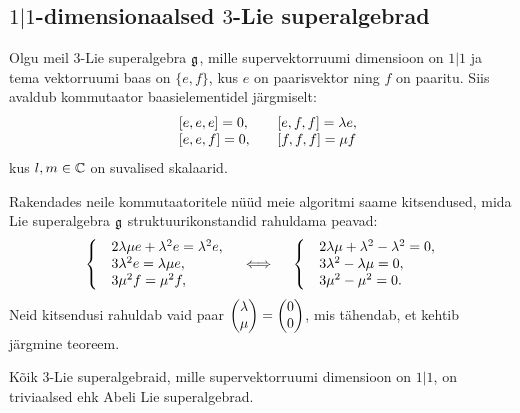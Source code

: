 
\subsection{\texorpdfstring{$1|1$}{1|1}-dimensionaalsed
    \texorpdfstring{$3$}{3}-Lie superalgebrad}

Olgu meil $3$-Lie superalgebra $\mathfrak{g}$, mille supervektorruumi dimensioon
on $1|1$ ja tema vektorruumi baas on $\{ e, f \}$, kus $e$ on paarisvektor
ning $f$ on paaritu. Siis avaldub kommutaator baasielementidel järgmiselt:
\begin{align*}
    \begin{matrix*}[l]
        &[e, e, e] = 0,\quad
        &[e, f, f] = \l e, \\
        &[e, e, f] = 0,\quad
        &[f, f, f] = \m f
    \end{matrix*}
\end{align*}
kus $l, m \in \mathbb{C}$ on suvalised skalaarid.

Rakendades neile kommutaatoritele nüüd meie algoritmi saame kitsendused,
mida Lie superalgebra $\mathfrak{g}$ struktuurikonstandid rahuldama peavad:
\begin{align*}
    \left\{
        \begin{matrix*}[l]
            &2\l\m e + \l^2 e =  \l^2 e, \\
            &3\l^2 e = \l\m e, \\
            &3\m^2 f = \m^2 f,
        \end{matrix*}
    \right.
    \quad \iff \quad
    \left\{
        \begin{matrix*}[l]
            &2\l\m + \l^2 - \l^2 = 0, \\
            &3\l^2 - \l\m = 0, \\
            &3\m^2 - \m^2 = 0.
        \end{matrix*}
    \right.
\end{align*}
Neid kitsendusi rahuldab vaid paar
$\begin{pmatrix}\lambda \\ \mu\end{pmatrix} = \begin{pmatrix}0 \\ 0\end{pmatrix}$,
mis tähendab, et kehtib järgmine teoreem.

\begin{thm}
    Kõik $3$-Lie superalgebraid, mille supervektorruumi dimensioon on $1|1$,
    on triviaalsed ehk Abeli Lie superalgebrad.
\end{thm}

